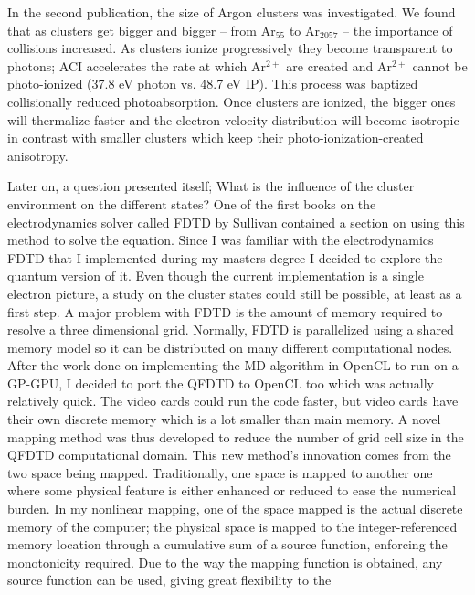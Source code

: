 In the second publication, the size of Argon clusters was investigated. We found
that as clusters get bigger and bigger -- from Ar$_{55}$ to Ar$_{2057}$ --
the importance of collisions increased. As clusters ionize progressively they
become transparent to photons; ACI accelerates the rate at which Ar$^{2+}$ are
created and Ar$^{2+}$ cannot be photo-ionized (37.8 eV photon vs. 48.7 eV IP).
This process was baptized collisionally reduced photoabsorption. Once clusters
are ionized, the bigger ones will thermalize faster and the electron velocity
distribution will become isotropic in contrast with smaller clusters which
keep their photo-ionization-created anisotropy.


Later on, a question presented itself; What is the influence of the cluster
environment on the different states? One of the first books on the
electrodynamics solver called FDTD by Sullivan contained a section on using
this method to solve the \schrodinger equation. Since I was familiar with
the electrodynamics FDTD that I implemented during my masters degree I decided
to explore the quantum version of it. Even though the current implementation is
a single electron picture, a study on the cluster states could still be possible,
at least as a first step. A major problem with FDTD is the amount of memory
required to resolve a three dimensional grid. Normally, FDTD is parallelized
using a shared memory model so it can be distributed on many different
computational nodes. After the work done on implementing the MD algorithm in
OpenCL to run on a GP-GPU, I decided to port the QFDTD to OpenCL too
which was actually relatively quick. The video cards could run the code faster,
but video cards have their own discrete memory which is a lot smaller than main
memory. A novel mapping method was thus developed to reduce the number of grid
cell size in the QFDTD computational domain. This new method's innovation comes
from the two space being mapped. Traditionally, one space is mapped to another
one where some physical feature is either enhanced or reduced to ease the numerical
burden. In my nonlinear mapping, one of the space mapped is the actual
discrete memory of the computer; the physical space is mapped to the
integer-referenced memory location through a cumulative sum of a source function,
enforcing the monotonicity required. Due to the way the mapping function is
obtained, any source function can be used, giving great flexibility to the
